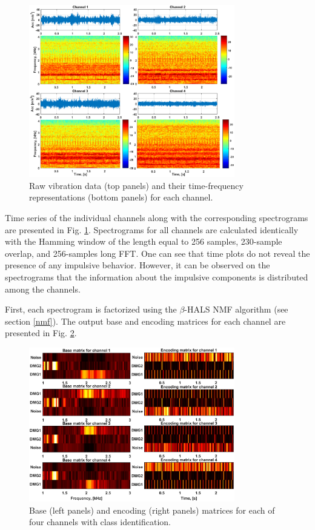 \documentclass[3p,12pt]{elsarticle}
\begin{document}
\begin{figure}[ht!]
\centering
\includegraphics[width=0.8\textwidth]{figs/raw.eps}
\caption{Raw vibration data (top panels) and their time-frequency representations (bottom panels) for each channel.}
\label{fig:raw_signal_all}
\end{figure}

Time series of the individual channels along with the corresponding spectrograms are presented in Fig. \ref{fig:raw_signal_all}. Spectrograms for all channels are calculated identically with the Hamming window of the length equal to 256 samples, 230-sample overlap, and 256-samples long FFT. One can see that time plots do not reveal the presence of any impulsive behavior. However, it can be observed on the spectrograms that the information about the impulsive components is distributed among the channels.


First, each spectrogram is factorized using the $\beta$-HALS NMF algorithm (see section \ref{nmf}).  The output base and encoding matrices for each channel are presented in Fig. \ref{fig:NMF_matrix}.




\begin{figure}[ht!]
\centering
\includegraphics[width=0.8\textwidth]{figs/mats3.eps}
\caption{Base (left panels) and encoding (right panels) matrices for each of four channels with class identification.}
\label{fig:NMF_matrix}
\end{figure}
\end{document}
